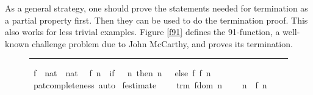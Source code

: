 \begin{isabellebody}
\endisatagproof
{\isafoldproof}%
%
\isadelimproof
%
\endisadelimproof
%
\begin{isamarkuptext}%
As a general strategy, one should prove the statements needed for
  termination as a partial property first. Then they can be used to do
  the termination proof. This also works for less trivial
  examples. Figure \ref{f91} defines the 91-function, a well-known
  challenge problem due to John McCarthy, and proves its termination.%
\end{isamarkuptext}%
\isamarkuptrue%
%
\begin{figure}
\hrule\vspace{6pt}
\begin{minipage}{0.8\textwidth}
\isastyle\isamarkuptrue
{}\isamarkupfalse%
\ f{}{}\ {}{}\ {}nat\ {}\ nat{}\isanewline
{}\isanewline
\ \ {}f{}{}\ n\ {}\ {}if\ {}{}{}\ {}\ n\ then\ n\ {}\ {}{}\ else\ f{}{}\ {}f{}{}\ {}n\ {}\ {}{}{}{}{}{}\isanewline
%
\isadelimproof
%
\endisadelimproof
%
\isatagproof
{}\isamarkupfalse%
\ pat{}completeness\ auto%
\endisatagproof
{\isafoldproof}%
%
\isadelimproof
\isanewline
%
\endisadelimproof
\isanewline
{}\isamarkupfalse%
\ f{}{}{}estimate{}\ \isanewline
\ \ \ trm{}\ {}f{}{}{}dom\ n{}\ \isanewline
\ \ \ {}n\ {}\ f{}{}\ n\ {}\ {}{}{}\isanewline

\end{minipage}
\end{figure}
\end{isabellebody}
